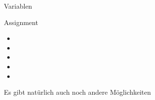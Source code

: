 \begin{task}[points=auto]{Variablen }
\begin{subtask*}[points=0]{Assignment}
        \begin{solution}
            \begin{itemize}
                \item {}
                \item {}
                \item {}
                \item {}
                \item {}
            \end{itemize}
            Es gibt natürlich auch noch andere Möglichkeiten
        \end{solution}
    \end{subtask*}
\end{task}
